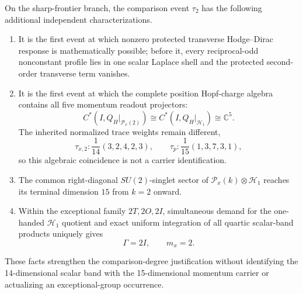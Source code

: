 \documentclass[12pt,a4paper]{article}
\begin{document}
\begin{corollary}
\label{p4:cor:v261-degree-two-strengthening}
On the sharp-frontier branch, the comparison event \(\tau_2\) has the
following additional independent characterizations.
\begin{enumerate}[label=(\roman*),leftmargin=2.1em]
\item It is the first event at which nonzero protected transverse
      Hodge--Dirac response is mathematically possible; before it, every
      reciprocal-odd nonconstant profile lies in one scalar Laplace shell and
      the protected second-order transverse term vanishes.
\item It is the first event at which the complete position Hopf-charge algebra
      contains all five momentum readout projectors:
      \[
       C^*(I,Q_H|_{\mathcal P_x(2)})\cong
       C^*(I,Q_H|_{\mathcal H_1})\cong\mathbb C^5.
      \]
      The inherited normalized trace weights remain different,
      \[
       \tau_{x,2}:\frac1{14}(3,2,4,2,3),\qquad
       \tau_p:\frac1{15}(1,3,7,3,1),
      \]
      so this algebraic coincidence is not a carrier identification.
\item The common right-diagonal \(SU(2)\)-singlet sector of
      \(\mathcal P_x(k)\otimes\mathcal H_1\) reaches its terminal dimension
      \(15\) from \(k=2\) onward.
\item Within the exceptional family \(2T,2O,2I\), simultaneous demand for the
      one-handed \(\mathcal H_1\) quotient and exact uniform integration of
      all quartic scalar-band products uniquely gives
      \[
       \boxed{\Gamma=2I,\qquad m_x=2.}
      \]
\end{enumerate}
These facts strengthen the comparison-degree justification without identifying
the 14-dimensional scalar band with the 15-dimensional momentum carrier or
actualizing an exceptional-group occurrence.
\end{corollary}
\end{document}
